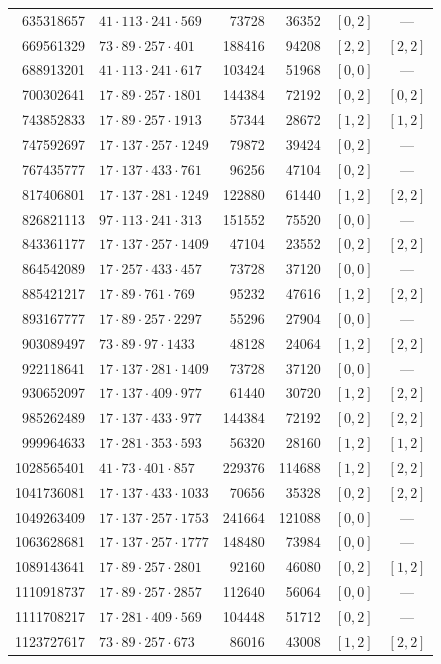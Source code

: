 \documentclass[11pt]{article}
\begin{document}
\begin{longtable}{r l r r c c}
635318657 & $41\cdot113\cdot241\cdot569$ & 73728 & 36352 & $[0,2]$ & ---\\
669561329 & $73\cdot89\cdot257\cdot401$ & 188416 & 94208 & $[2,2]$ & $[2,2]$\\
688913201 & $41\cdot113\cdot241\cdot617$ & 103424 & 51968 & $[0,0]$ & ---\\
700302641 & $17\cdot89\cdot257\cdot1801$ & 144384 & 72192 & $[0,2]$ & $[0,2]$\\
743852833 & $17\cdot89\cdot257\cdot1913$ & 57344 & 28672 & $[1,2]$ & $[1,2]$\\
747592697 & $17\cdot137\cdot257\cdot1249$ & 79872 & 39424 & $[0,2]$ & ---\\
767435777 & $17\cdot137\cdot433\cdot761$ & 96256 & 47104 & $[0,2]$ & ---\\
817406801 & $17\cdot137\cdot281\cdot1249$ & 122880 & 61440 & $[1,2]$ & $[2,2]$\\
826821113 & $97\cdot113\cdot241\cdot313$ & 151552 & 75520 & $[0,0]$ & ---\\
843361177 & $17\cdot137\cdot257\cdot1409$ & 47104 & 23552 & $[0,2]$ & $[2,2]$\\
864542089 & $17\cdot257\cdot433\cdot457$ & 73728 & 37120 & $[0,0]$ & ---\\
885421217 & $17\cdot89\cdot761\cdot769$ & 95232 & 47616 & $[1,2]$ & $[2,2]$\\
893167777 & $17\cdot89\cdot257\cdot2297$ & 55296 & 27904 & $[0,0]$ & ---\\
903089497 & $73\cdot89\cdot97\cdot1433$ & 48128 & 24064 & $[1,2]$ & $[2,2]$\\
922118641 & $17\cdot137\cdot281\cdot1409$ & 73728 & 37120 & $[0,0]$ & ---\\
930652097 & $17\cdot137\cdot409\cdot977$ & 61440 & 30720 & $[1,2]$ & $[2,2]$\\
985262489 & $17\cdot137\cdot433\cdot977$ & 144384 & 72192 & $[0,2]$ & $[2,2]$\\
999964633 & $17\cdot281\cdot353\cdot593$ & 56320 & 28160 & $[1,2]$ & $[1,2]$\\
1028565401 & $41\cdot73\cdot401\cdot857$ & 229376 & 114688 & $[1,2]$ & $[2,2]$\\
1041736081 & $17\cdot137\cdot433\cdot1033$ & 70656 & 35328 & $[0,2]$ & $[2,2]$\\
1049263409 & $17\cdot137\cdot257\cdot1753$ & 241664 & 121088 & $[0,0]$ & ---\\
1063628681 & $17\cdot137\cdot257\cdot1777$ & 148480 & 73984 & $[0,0]$ & ---\\
1089143641 & $17\cdot89\cdot257\cdot2801$ & 92160 & 46080 & $[0,2]$ & $[1,2]$\\
1110918737 & $17\cdot89\cdot257\cdot2857$ & 112640 & 56064 & $[0,0]$ & ---\\
1111708217 & $17\cdot281\cdot409\cdot569$ & 104448 & 51712 & $[0,2]$ & ---\\
1123727617 & $73\cdot89\cdot257\cdot673$ & 86016 & 43008 & $[1,2]$ & $[2,2]$\\
\end{longtable}
\endgroup
\end{document}
